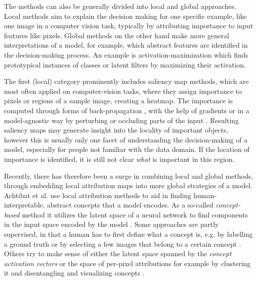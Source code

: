 The methods can also be generally divided into local and global approaches. Local methods aim to explain the decision making for one specific example, like one image in a computer vision task, typically by attributing importance to input features like pixels. Global methods on the other hand make more general interpretations of a model, for example, which abstract features are identified in the decision-making process. An example is activation-maximization \cite{Nguyen2016} which finds prototypical instances of classes or latent filters by maximizing their activation. 

The first (local) category prominently includes saliency map methods, which are most often applied on computer-vision tasks, where they assign importance to pixels or regions of a sample image, creating a heatmap. 
The importance is computed through forms of back-propagation \cite{Bach2015,Zhang2016,Kindermans2017}, with the help of gradients \cite{Sundararajan2017,Smilkov2017} or in a model-agnostic way by perturbing or occluding parts of the input \cite{Lundberg2017,Zeiler2013,Zintgraf2017,Agarwal2020}. Resulting saliency maps may generate insight into the locality of important objects, however this is usually only one facet of understanding the decision-making of a model, especially for people not familiar with the data domain. If the location of importance is identified, it is still not clear \textit{what} is important in this region.   

Recently, there has therefore been a surge in combining local and global methods, through embedding local attribution maps into more global strategies of a model. Achtibat et al. \cite{Achtibat2022} use local attribution methods to aid in finding human-interpretable, abstract concepts that a model encodes. As a so-called \textit{concept-based} method it utilizes the latent space of a neural network to find components in the input space encoded by the model \cite{Bau2017,Bau2020,Kim2018, Ghorbani2019, Zhang2021, Fel2023a}. 
Some approaches are partly supervised, in that a human has to first define what a concept is, e.g. by labelling a ground truth or by selecting a few images that belong to a certain concept \cite{Kim2018, Singla2022}. Others try to make sense of either the latent space spanned by the \textit{concept activation vectors} or the space of per-pixel attributions for example by clustering it \cite{Lapuschkin2019,Vielhaben2023} and disentangling and visualizing concepts  \cite{Ghorbani2019,Zhang2021,Leemann2023,Fel2023,Chormai2022, Singla2022}.

